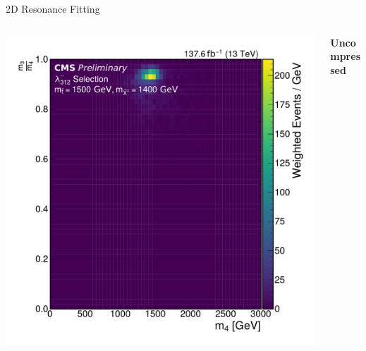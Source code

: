 \documentclass[]{beamer}
\begin{document}
\begin{frame}{2D Resonance Fitting}
\begin{columns}[t]
\begin{column}{0.3\textwidth}
\begin{onlyenv}
\begin{center}
          \includegraphics[width=\thiswidth\textwidth]{figures/ratio_m14_vs_m13_signal_312_1500_1400.pdf}
        \end{center}
      \end{onlyenv}
    \end{column}
    \begin{column}{0.3\textwidth}
       \centering \textbf{Uncompressed} 
        \vspace*{-\baselineskip}


\end{column}
\end{columns}
\end{frame}
\end{document}
